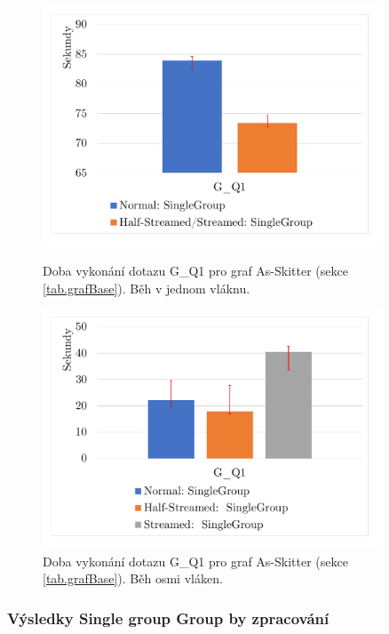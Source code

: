 \begin{figure}[!htp]
    \centering
    \begin{minipage}{0.45\textwidth}
        \centering
        \includegraphics[width=0.9\textwidth]{../img/skitterGroupByQ1ST.pdf} %
        \caption{Doba vykonání dotazu G\_Q1 pro graf As-Skitter (sekce \ref{tab.grafBase}). Běh v jednom vláknu.}
        \label{figure.skitterGQ1ST}
    \end{minipage}\hfill
    \begin{minipage}{0.45\textwidth}
        \centering
        \includegraphics[width=0.9\textwidth]{../img/skitterGroupByQ1Par.pdf} %
        \caption{Doba vykonání dotazu G\_Q1 pro graf As-Skitter (sekce \ref{tab.grafBase}). Běh osmi vláken.}
        \label{figure.skitterGQ1Par}
    \end{minipage}
\end{figure}

\subsubsection{Výsledky Single group Group by zpracování}

